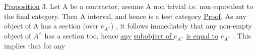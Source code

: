 \uline{Proposition} 3. Let A be a contractor, assume A non trivial i.e.
non equivalent to the final category. Then A 
interval, and hence  is a  test category
\uline{Proof}. As any object of A has a section (over $e_{A^{\wedge}}$) , it follows
immediately that any non-empty object of $A^{\wedge}$ has a section too, hence
\uline{any} \uline{subobject of $e_{A^{\wedge}}$} \uline{is equal to} $e_{A^{\wedge}}$ . This implies that for any

